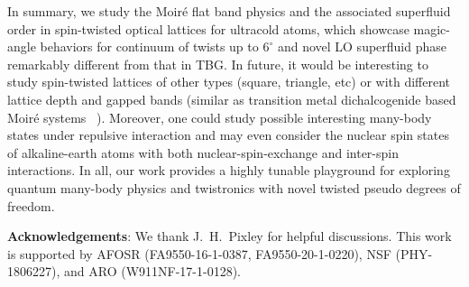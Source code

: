 \documentclass[twocolumn,english,prl,floatfix,citeautoscript,nofootinbib]{revtex4}
\begin{document}
In summary, we study the Moir\'{e} flat band physics and the associated
superfluid order in spin-twisted optical lattices for ultracold atoms, which
showcase magic-angle behaviors for continuum of twists up to $6^{\circ }$
and novel LO superfluid phase remarkably different from that in TBG.
In future, it would be interesting to study spin-twisted lattices of other
types (square, triangle, etc) or with different lattice depth and gapped
bands (similar as transition metal dichalcogenide based Moir\'{e} systems~%
\cite{PhysRevLett.121.026402,Nature579.353}). Moreover, one could study
possible interesting many-body states under repulsive interaction and may
even consider the nuclear spin states of alkaline-earth atoms with both
nuclear-spin-exchange and inter-spin interactions.
In all, our work provides a highly tunable playground for exploring quantum
many-body physics and twistronics with novel twisted pseudo degrees of
freedom.

%

\begin{acknowledgments}
\textbf{Acknowledgements}: We thank J.~H.~Pixley for helpful discussions.
This work is supported by AFOSR (FA9550-16-1-0387, FA9550-20-1-0220), NSF
(PHY-1806227), and ARO (W911NF-17-1-0128).
\end{acknowledgments}
\end{document}
